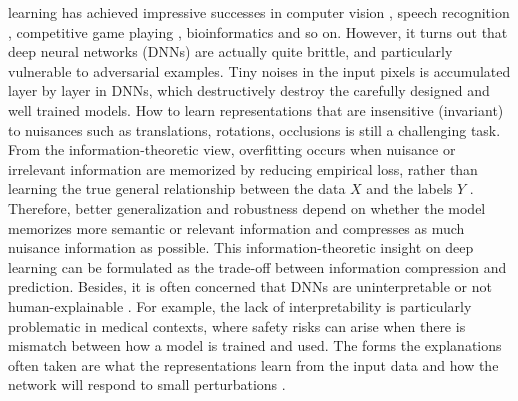 \documentclass[10pt,journal,compsoc]{IEEEtran}
\begin{document}
\maketitle


\IEEEdisplaynontitleabstractindextext

%
\IEEEpeerreviewmaketitle




 learning has achieved impressive successes in computer vision \cite{He2016DeepRL, Huang2017DenselyCC}, speech recognition \cite{AbdelHamid2014ConvolutionalNN}, competitive game playing \cite{Silver2017MasteringCA}, bioinformatics \cite{Cao2019SimpleTO} and so on. However, it turns out that deep neural networks (DNNs) are actually quite brittle, and particularly vulnerable to adversarial examples. Tiny noises in the input pixels is accumulated layer by layer in DNNs, which destructively destroy the carefully designed and well trained models. How to learn representations that are insensitive (invariant) to nuisances such as translations, rotations, occlusions is still a challenging task.
From the information-theoretic view, overfitting occurs when nuisance or irrelevant information are memorized by reducing empirical loss, rather than learning the true general relationship between the data $X$ and the labels $Y$ \cite{Krueger2017DeepND,Bashir2020AnIP}. Therefore, better generalization and robustness depend on whether the model memorizes more semantic or relevant information and compresses as much nuisance information as possible. This information-theoretic insight on deep learning can be formulated as the trade-off between information compression and prediction.
Besides, it is often concerned that DNNs are uninterpretable or not human-explainable \cite{10.1093/nsr/nwaa159}. For example, the lack of interpretability is particularly problematic in medical contexts, where safety risks can arise when there is mismatch between how a model is trained and used. The forms the explanations often taken are what the representations learn from the input data and how the network will respond to small perturbations \cite{Ribeiro2016WhySI,ShwartzZiv2017OpeningTB}.
\end{document}
